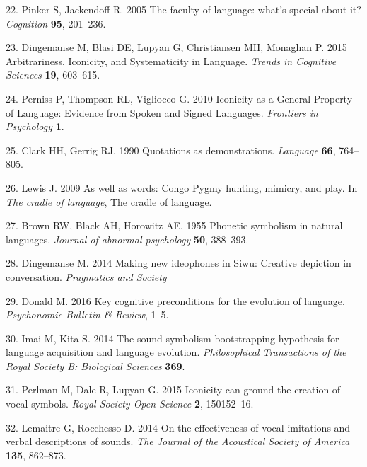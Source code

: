 \documentclass[english,floatsintext,man]{apa6}
\theoremstyle{definition}
\theoremstyle{definition}
\theoremstyle{definition}
\theoremstyle{remark}
\begin{document}
\leavevmode\hypertarget{ref-Pinker:2005cv}{}%
22. Pinker S, Jackendoff R. 2005 The faculty of language: what's special
about it? \emph{Cognition} \textbf{95}, 201--236.

\leavevmode\hypertarget{ref-Dingemanse:2015cu}{}%
23. Dingemanse M, Blasi DE, Lupyan G, Christiansen MH, Monaghan P. 2015
Arbitrariness, Iconicity, and Systematicity in Language. \emph{Trends in
Cognitive Sciences} \textbf{19}, 603--615.

\leavevmode\hypertarget{ref-Perniss:2010fb}{}%
24. Perniss P, Thompson RL, Vigliocco G. 2010 Iconicity as a General
Property of Language: Evidence from Spoken and Signed Languages.
\emph{Frontiers in Psychology} \textbf{1}.

\leavevmode\hypertarget{ref-Clark:1990cl}{}%
25. Clark HH, Gerrig RJ. 1990 Quotations as demonstrations.
\emph{Language} \textbf{66}, 764--805.

\leavevmode\hypertarget{ref-Lewis:2009wz}{}%
26. Lewis J. 2009 As well as words: Congo Pygmy hunting, mimicry, and
play. In \emph{The cradle of language}, The cradle of language.

\leavevmode\hypertarget{ref-Brown:1955wy}{}%
27. Brown RW, Black AH, Horowitz AE. 1955 Phonetic symbolism in natural
languages. \emph{Journal of abnormal psychology} \textbf{50}, 388--393.

\leavevmode\hypertarget{ref-Dingemanse:2014gj}{}%
28. Dingemanse M. 2014 Making new ideophones in Siwu: Creative depiction
in conversation. \emph{Pragmatics and Society}

\leavevmode\hypertarget{ref-Donald:2016kd}{}%
29. Donald M. 2016 Key cognitive preconditions for the evolution of
language. \emph{Psychonomic Bulletin \& Review}, 1--5.

\leavevmode\hypertarget{ref-Imai:2014dea}{}%
30. Imai M, Kita S. 2014 The sound symbolism bootstrapping hypothesis
for language acquisition and language evolution. \emph{Philosophical
Transactions of the Royal Society B: Biological Sciences} \textbf{369}.

\leavevmode\hypertarget{ref-Perlman:2015ip}{}%
31. Perlman M, Dale R, Lupyan G. 2015 Iconicity can ground the creation
of vocal symbols. \emph{Royal Society Open Science} \textbf{2},
150152--16.

\leavevmode\hypertarget{ref-Lemaitre:2014kr}{}%
32. Lemaitre G, Rocchesso D. 2014 On the effectiveness of vocal
imitations and verbal descriptions of sounds. \emph{The Journal of the
Acoustical Society of America} \textbf{135}, 862--873.
\end{document}
